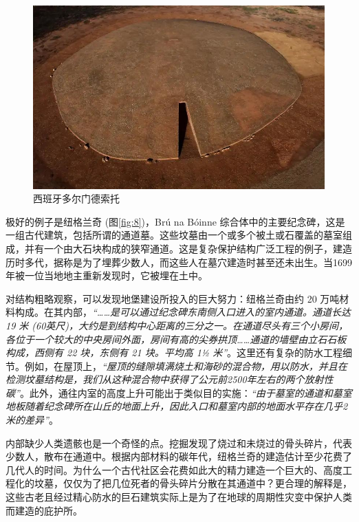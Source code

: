 \documentclass[10pt,twocolumn,letterpaper]{article}
\begin{document}
\begin{figure}[b]
\begin{center}
   \includegraphics[width=1\linewidth]{dolmen.jpg}
\end{center}
   \caption{西班牙多尔门德索托 \cite{53}}
\label{fig:9}
\label{fig:onecol}
\end{figure}

极好的例子是纽格兰奇 (图\ref{fig:8})，Brú na Bóinne 综合体中的主要纪念碑，这是一组古代建筑，包括所谓的通道墓。这些坟墓由一个或多个被土或石覆盖的墓室组成，并有一个由大石块构成的狭窄通道\cite{70}。这是复杂保护结构广泛工程的例子，建造历时多代，据称是为了埋葬少数人，而这些人在墓穴建造时甚至还未出生。当1699年被一位当地地主重新发现时，它被埋在土中。

对结构粗略观察，可以发现地堡建设所投入的巨大努力：纽格兰奇由约 20 万吨材料构成。在其内部，\textit{“……是可以通过纪念碑东南侧入口进入的室内通道。通道长达 19 米 (60英尺)，大约是到结构中心距离的三分之一。在通道尽头有三个小房间，各位于一个较大的中央房间外面，房间有高的尖券拱顶……通道的墙壁由立石石板构成，西侧有 22 块，东侧有 21 块。平均高 1½ 米”}\cite{70}。这里还有复杂的防水工程细节。例如，在屋顶上，\textit{“屋顶的缝隙填满烧土和海砂的混合物，用以防水，并且在检测坟墓结构是，我们从这种混合物中获得了公元前2500年左右的两个放射性碳”}\cite{71}。此外，通往内室的高度上升可能出于类似目的实施：\textit{“由于墓室的通道和墓室地板随着纪念碑所在山丘的地面上升，因此入口和墓室内部的地面水平存在几乎2米的差异”}\cite{71}。


内部缺少人类遗骸也是一个奇怪的点。挖掘发现了烧过和未烧过的骨头碎片，代表少数人，散布在通道中。根据内部材料的碳年代，纽格兰奇的建造估计至少花费了几代人的时间。为什么一个古代社区会花费如此大的精力建造一个巨大的、高度工程化的坟墓，仅仅为了把几位死者的骨头碎片分散在其通道中？更合理的解释是，这些古老且经过精心防水的巨石建筑实际上是为了在地球的周期性灾变中保护人类而建造的庇护所。
\end{document}
